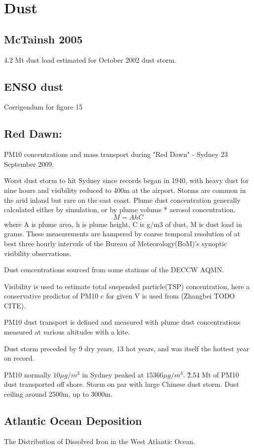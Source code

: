 \section{Dust}

\subsection{McTainsh 2005}
4.2 Mt dust load estimated for October 2002 dust storm.

\subsection{ENSO dust \cite{Rotstayn_2011}}
Corrigendum for figure 15

\subsection{Red Dawn: \cite{Leys_2011}}
PM10 concentrations and mass transport during "Red Dawn" - Sydney 23 September 2009.

Worst dust storm to hit Sydney since records began in 1940, with heavy dust for nine hours and visibility reduced to 400m at the airport.
Storms are common in the arid inland but rare on the east coast.
Plume dust concentration generally calculated either by simulation, or by plume volume * aerosol concentration.
$$M = AhC$$ 
where A is plume area, h is plume height, C is g/m3 of dust, M is dust load in grams.
These measurements are hampered by coarse temporal resolution of at best three hourly intervals of the Bureau of Meteorology(BoM)'s synoptic visibility observations.

Dust concentrations sourced from some stations of the DECCW AQMN.

Visibility is used to estimate total suspended particle(TSP) concentration, here a conservative predictor of PM10 c for given V is used from (Zhangbei TODO CITE).

PM10 dust transport is defined and measured with plume dust concentrations measured at various altitudes with a kite. 

Dust storm preceded by 9 dry years, 13 hot years, and was itself the hottest year on record.

PM10 normally $10{\mu}g/m^3$ in Sydney peaked at $15366{\mu}g/m^3$.
\~2.54 Mt of PM10 dust transported off shore.
Storm on par with large Chinese dust storm.
Dust ceiling around 2500m, up to 3000m.

\subsection{Atlantic Ocean Deposition \cite{Rijkenberg_2014}}
The Distribution of Dissolved Iron in the West Atlantic Ocean.

